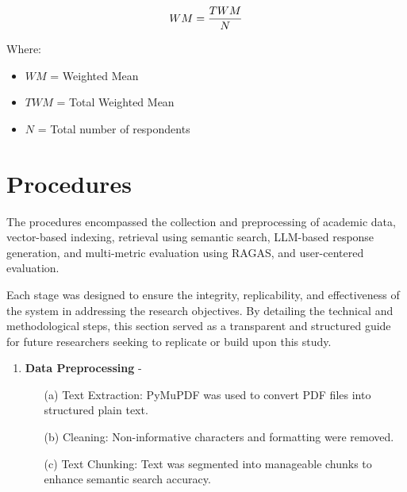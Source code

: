 \begin{refsection}
\begin{equation}
    \centering
    WM = \frac{TWM}{N}
\end{equation}

Where:
\begin{itemize}
    \item $WM$ = Weighted Mean
    \item $TWM$ = Total Weighted Mean
    \item $N$ = Total number of respondents
\end{itemize}

\section{Procedures}

The procedures encompassed the collection and preprocessing of academic data, vector-based indexing, retrieval using semantic search, LLM-based response generation, and multi-metric evaluation using RAGAS, and user-centered evaluation.

Each stage was designed to ensure the integrity, replicability, and effectiveness of the system in addressing the research objectives. By detailing the technical and methodological steps, this section served as a transparent and structured guide for future researchers seeking to replicate or build upon this study.



\begin{enumerate}

    \item \textbf{Data Preprocessing} - 
        \begin{enumerate}
            \item [(a)] {Text Extraction:} PyMuPDF was used to convert PDF files into structured plain text.
            \item [(b)] {Cleaning:} Non-informative characters and formatting were removed.
            \item [(c)] {Text Chunking:} Text was segmented into manageable chunks to enhance semantic search accuracy.
        \end{enumerate}
        

\end{enumerate}
\end{refsection}
